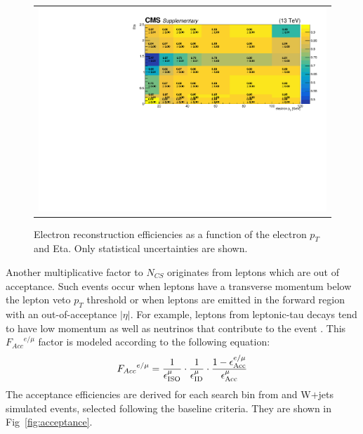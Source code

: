\begin{figure}[hptb]
\begin{center}
\begin{tabular}{c}
\includegraphics[width=1.0\textwidth]{sections/mc4/Backgrounds/LostLepton/figures/v3_2d_effs_els_reco_no_baseline.pdf}
\end{tabular}
\end{center}
\caption{Electron reconstruction efficiencies as a function of the electron $p_T$ and Eta. Only statistical uncertainties
are shown.}
\label{fig:eleeffreco}
\end{figure}

Another multiplicative factor to $N_{CS}$ originates from leptons which 
are out of acceptance. Such events occur when leptons have a transverse 
momentum below the lepton veto $p_{T}$ threshold or when leptons are emitted in 
the forward region with an out-of-acceptance $|\eta|$. %
For example, leptons from leptonic-tau decays tend to have low 
momentum as well as neutrinos that contribute to the event \MET. 
This ${F_{Acc}}^{e/\mu}$ factor is modeled according to the following equation:
\begin{equation}
{F_{Acc}}^{e/\mu} = \frac{1}{\epsilon_{\rm ISO}^{\mu}}\cdot \frac{1}{\epsilon_{\rm ID}^{\mu}}  \cdot \frac{1 - \epsilon^{e/\mu}_{\rm Acc}}{\epsilon^{\mu}_{\rm Acc}}
\label{eq:accept}
\end{equation}
The acceptance efficiencies are derived for each search bin 
from \ttbar and W$+$jets simulated events,
selected following the baseline criteria. 
They are shown in Fig~\ref{fig:acceptance}.

